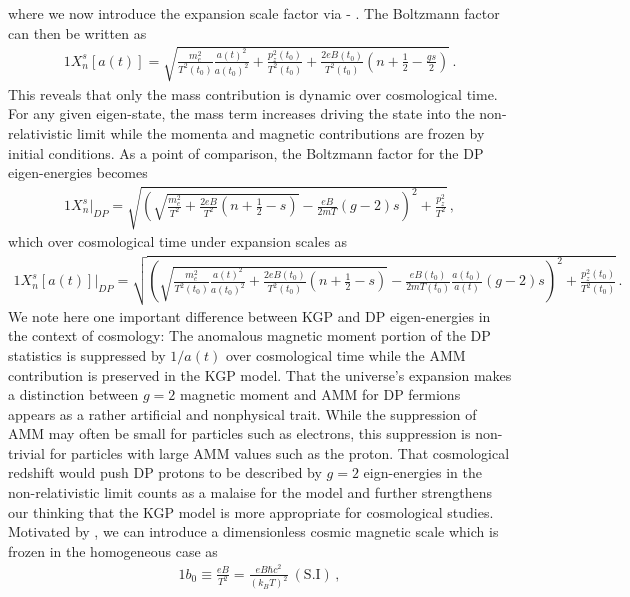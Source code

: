 where we now introduce the expansion scale factor via  - . The Boltzmann factor can then be written as
\begin{alignat}{1}
    \label{XScale} X_{n}^{s}[a(t)] = \sqrt{\frac{m_{e}^{2}}{T^{2}(t_{0})}\frac{a(t)^{2}}{a(t_{0})^{2}}+\frac{p_{z}^{2}(t_{0})}{T^{2}(t_{0})}+\frac{2eB(t_{0})}{T^{2}(t_{0})}\left(n+\frac{1}{2}-\frac{gs}{2}\right)}\,.
\end{alignat}
This reveals that only the mass contribution is dynamic over cosmological time. For any given eigen-state, the mass term increases driving the state into the non-relativistic limit while the momenta and magnetic contributions are frozen by initial conditions. As a point of comparison, the Boltzmann factor for the DP eigen-energies becomes
\begin{alignat}{1}
    \label{XDP} X_{n}^{s}\vert_{DP} = \sqrt{\left(\sqrt{\frac{m_{e}^{2}}{T^{2}}+\frac{2eB}{T^{2}}\left(n+\frac{1}{2}-s\right)}-\frac{eB}{2mT}(g-2)s\right)^{2}+\frac{p_{z}^{2}}{T^{2}}}\,,
\end{alignat}
which over cosmological time under expansion scales as
\begin{alignat}{1}
    \label{XScaleDP} X_{n}^{s}[a(t)]\vert_{DP} = \sqrt{\left(\sqrt{\frac{m_{e}^{2}}{T^{2}(t_{0})}\frac{a(t)^{2}}{a(t_{0})^{2}}+\frac{2eB(t_{0})}{T^{2}(t_{0})}\left(n+\frac{1}{2}-s\right)}-\frac{eB(t_{0})}{2mT(t_{0})}\frac{a(t_{0})}{a(t)}(g-2)s\right)^{2}+\frac{p_{z}^{2}(t_{0})}{T^{2}(t_{0})}}\,.
\end{alignat}
We note here one important difference between KGP and DP eigen-energies in the context of cosmology: The anomalous magnetic moment portion of the DP statistics is suppressed by $1/a(t)$ over cosmological time while the AMM contribution is preserved in the KGP model. That the universe's expansion makes a distinction between $g=2$ magnetic moment and AMM for DP fermions appears as a rather artificial and nonphysical trait. While the suppression of AMM may often be small for particles such as electrons, this suppression is non-trivial for particles with large AMM values such as the proton. That cosmological redshift would push DP protons to be described by $g=2$ eign-energies in the non-relativistic limit counts as a malaise for the model and further strengthens our thinking that the KGP model is more appropriate for cosmological studies. Motivated by , we can introduce a dimensionless cosmic magnetic scale which is frozen in the homogeneous case as
\begin{alignat}{1}
    \label{Bo} b_{0}\equiv\frac{eB}{T^{2}}=\frac{eB\hbar c^{2}}{(k_{B}T)^{2}}\ \mathrm{(S.I)}\,,
\end{alignat}
